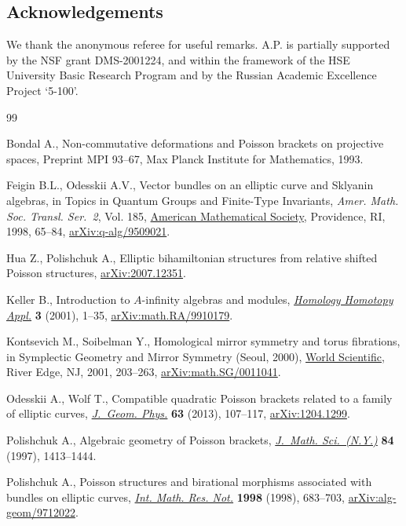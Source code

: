 \documentclass[10pt,a4paper]{amsart}
\numberwithin{equation}{section}
\begin{document}
\subsection*{Acknowledgements}

We thank the anonymous referee for useful remarks.
A.P. is partially supported by the NSF grant DMS-2001224,
and within the framework of the HSE University Basic Research Program and by the Russian Academic Excellence Project `5-100'.


\begin{thebibliography}{99}
\footnotesize\itemsep=0pt

Bondal A., Non-commutative deformations and {P}oisson brackets on projective
 spaces, {P}reprint MPI 93--67, Max Planck Institute for Mathematics, 1993.

Feigin B.L., Odesskii A.V., Vector bundles on an elliptic curve and {S}klyanin
 algebras, in Topics in Quantum Groups and Finite-Type Invariants,
 \textit{Amer. Math. Soc. Transl. Ser.~2}, Vol. 185, \href{https://doi.org/10.1090/trans2/185/04}{American Mathematical
 Society}, Providence, RI, 1998, 65--84, \href{https://arxiv.org/abs/arXiv:q-alg/9509021}{arXiv:q-alg/9509021}.

Hua Z., Polishchuk A., Elliptic bihamiltonian structures from relative shifted {P}oisson structures, \href{https://arxiv.org/abs/2007.12351}{arXiv:2007.12351}.

Keller B., Introduction to {$A$}-infinity algebras and modules,
 \href{https://doi.org/10.4310/hha.2001.v3.n1.a1}{\textit{Homology Homotopy Appl.}} \textbf{3} (2001), 1--35,
 \href{https://arxiv.org/abs/math.RA/9910179}{arXiv:math.RA/9910179}.

Kontsevich M., Soibelman Y., Homological mirror symmetry and torus fibrations,
 in Symplectic Geo\-met\-ry and Mirror Symmetry ({S}eoul, 2000), \href{https://doi.org/10.1142/9789812799821_0007}{World Scientific},
 River Edge, NJ, 2001, 203--263, \href{https://arxiv.org/abs/math.SG/0011041}{arXiv:math.SG/0011041}.

Odesskii A., Wolf T., Compatible quadratic {P}oisson brackets related to a
 family of elliptic curves, \href{https://doi.org/10.1016/j.geomphys.2012.10.004}{\textit{J.~Geom. Phys.}} \textbf{63} (2013),
 107--117, \href{https://arxiv.org/abs/1204.1299}{arXiv:1204.1299}.

Polishchuk A., Algebraic geometry of {P}oisson brackets, \href{https://doi.org/10.1007/BF02399197}{\textit{J.~Math.
 Sci.~(N.Y.)}} \textbf{84} (1997), 1413--1444.

Polishchuk A., Poisson structures and birational morphisms associated with
 bundles on elliptic curves, \href{https://doi.org/10.1155/S1073792898000415}{\textit{Int. Math. Res. Not.}} \textbf{1998}
 (1998), 683--703, \href{https://arxiv.org/abs/alg-geom/9712022}{arXiv:alg-geom/9712022}.

\end{thebibliography}
\end{document}

